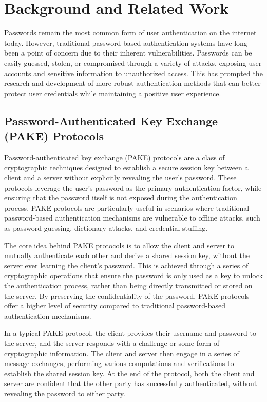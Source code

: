 \section{Background and Related Work}
\label{sec:relwork}
Passwords remain the most common form of user authentication on the internet today. However, traditional password-based authentication systems have long been a point of concern due to their inherent vulnerabilities. Passwords can be easily guessed, stolen, or compromised through a variety of attacks, exposing user accounts and sensitive information to unauthorized access. This has prompted the research and development of more robust authentication methods that can better protect user credentials while maintaining a positive user experience.

\subsection{Password-Authenticated Key Exchange (PAKE) Protocols}
\label{sec:pake}

Password-authenticated key exchange (PAKE) protocols are a class of cryptographic techniques designed to establish a secure session key between a client and a server without explicitly revealing the user's password. These protocols leverage the user's password as the primary authentication factor, while ensuring that the password itself is not exposed during the authentication process. PAKE protocols are particularly useful in scenarios where traditional password-based authentication mechanisms are vulnerable to offline attacks, such as password guessing, dictionary attacks, and credential stuffing.

The core idea behind PAKE protocols is to allow the client and server to mutually authenticate each other and derive a shared session key, without the server ever learning the client's password. This is achieved through a series of cryptographic operations that ensure the password is only used as a key to unlock the authentication process, rather than being directly transmitted or stored on the server. By preserving the confidentiality of the password, PAKE protocols offer a higher level of security compared to traditional password-based authentication mechanisms.

In a typical PAKE protocol, the client provides their username and password to the server, and the server responds with a challenge or some form of cryptographic information. The client and server then engage in a series of message exchanges, performing various computations and verifications to establish the shared session key. At the end of the protocol, both the client and server are confident that the other party has successfully authenticated, without revealing the password to either party.

